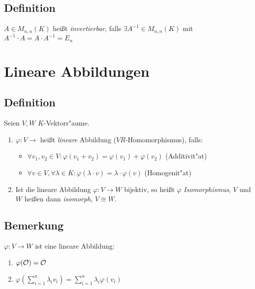 	 \subsection{Definition}
	 
	 $A \in M_{n,n}(K)$ heißt \emph{invertierbar}, falls $\exists  A^{-1} \in M_{n,n}(K)$ mit $A^{-1} \cdot A = A \cdot A^{-1} = E_n$
	 
\section{Lineare Abbildungen}
\subsection{Definition}

Seien $V,W$ $K$-Vektorr"aume.
\begin{enumerate}
	\item
	$\varphi: V \rightarrow$ heißt \emph{lineare} Abbildung ($VR$-Homomorphismus), falls:
	\begin{itemize}
		\item
		$\forall v_1, v_2 \in V: \varphi(v_1+v_2) = \varphi(v_1) + \varphi(v_2)$ (Additivit"at)
		\item
		$\forall v \in V, \forall \lambda \in K: \varphi(\lambda \cdot v) = \lambda \cdot \varphi(v)$ (Homogenit"at)
	\end{itemize}
	\item
	Ist die lineare Abbildung $\varphi: V \rightarrow W$ bijektiv, so heißt $\varphi$ \emph{Isomorphismus}, $V$ und $W$ heißen dann \emph{isomorph}, $V \cong W$.
\end{enumerate}
\subsection{Bemerkung}
$\varphi: V \rightarrow W$ ist eine lineare Abbildung:
\begin{enumerate}
	\item
	$\varphi( \mathcal{O}) = \mathcal{O}$
	\item
	$\varphi \left(\sum_{i=1}^{n} \lambda_i v_i \right) = \sum_{i=1}^{n} \lambda_i \varphi(v_i)$ 
\end{enumerate}
